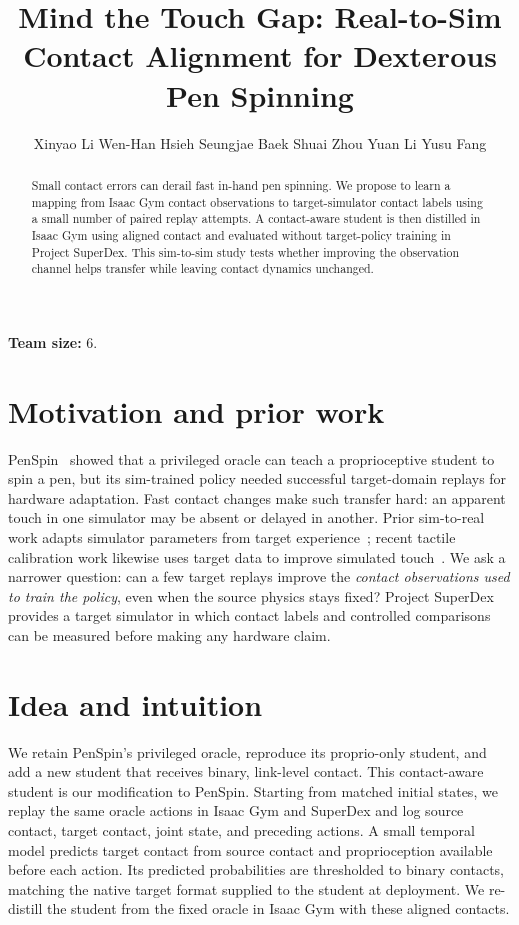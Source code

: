 \documentclass{article}
\title{Mind the Touch Gap: Real-to-Sim Contact Alignment for Dexterous Pen Spinning}
\author{
  Xinyao Li \And Wen-Han Hsieh \And Seungjae Baek
  \AND
  Shuai Zhou \And Yuan Li \And Yusu Fang
}
\begin{document}
\maketitle
\noindent\textbf{Team size:} 6.

\begin{abstract}
Small contact errors can derail fast in-hand pen spinning. We propose to learn a mapping from Isaac Gym contact observations to target-simulator contact labels using a small number of paired replay attempts. A contact-aware student is then distilled in Isaac Gym using aligned contact and evaluated without target-policy training in Project SuperDex. This sim-to-sim study tests whether improving the observation channel helps transfer while leaving contact dynamics unchanged.
\end{abstract}

\section{Motivation and prior work}
PenSpin~\citep{wang2024penspin} showed that a privileged oracle can teach a proprioceptive student to spin a pen, but its sim-trained policy needed successful target-domain replays for hardware adaptation. Fast contact changes make such transfer hard: an apparent touch in one simulator may be absent or delayed in another. Prior sim-to-real work adapts simulator parameters from target experience~\citep{chebotar2019closing}; recent tactile calibration work likewise uses target data to improve simulated touch~\citep{real2sim2real2026}. We ask a narrower question: can a few target replays improve the \emph{contact observations used to train the policy}, even when the source physics stays fixed? Project SuperDex~\citep{superdex2026} provides a target simulator in which contact labels and controlled comparisons can be measured before making any hardware claim.

\section{Idea and intuition}
We retain PenSpin's privileged oracle, reproduce its proprio-only student, and add a new student that receives binary, link-level contact. This contact-aware student is our modification to PenSpin. Starting from matched initial states, we replay the same oracle actions in Isaac Gym and SuperDex and log source contact, target contact, joint state, and preceding actions. A small temporal model predicts target contact from source contact and proprioception available before each action. Its predicted probabilities are thresholded to binary contacts, matching the native target format supplied to the student at deployment. We re-distill the student from the fixed oracle in Isaac Gym with these aligned contacts.
\end{document}
